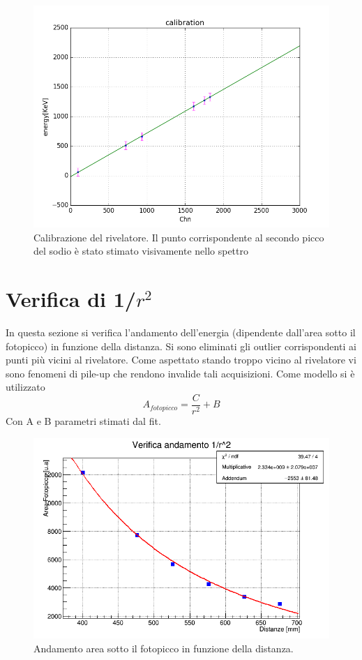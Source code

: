 \documentclass[a4paper]{article}
\begin{document}
\begin{figure}[!h]
\includegraphics[width=1\textwidth]{calibrazione}
        \caption{Calibrazione del rivelatore. Il punto corrispondente al secondo picco del sodio è stato stimato visivamente nello spettro}
        \label{fig:2}
\end{figure}





\section{Verifica di 1/$r^2$}
In questa sezione si verifica l'andamento dell'energia (dipendente dall'area sotto il fotopicco) in funzione della distanza. Si sono eliminati gli outlier corrispondenti ai punti più vicini al rivelatore. Come aspettato stando troppo vicino al rivelatore vi sono fenomeni di pile-up che rendono invalide tali acquisizioni. Come modello si è utilizzato \begin{equation}
A_{fotopicco}=\frac{C}{r^{2}}+B
\end{equation}
Con A e B parametri stimati dal fit.
\begin{figure}[H]
\includegraphics[width=1\textwidth]{inverserootlawwithpars}
        \caption{Andamento area sotto il fotopicco in funzione della distanza.}
        \label{fig:2}
\end{figure}
\end{document}
